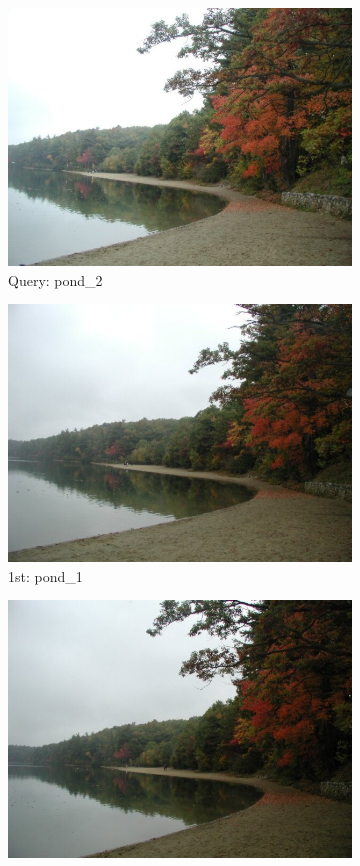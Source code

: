 \begin{itemize}
\begin{figure}[H]
	\centering
	\begin{subfigure}{0.25\textwidth}
	  \centering
	  \includegraphics[width=0.9\linewidth]{../input/pond_2.jpg}
	  \caption{Query: pond\_2}
	\end{subfigure}%
	\begin{subfigure}{0.25\textwidth}
	  \centering
	  \includegraphics[width=0.9\linewidth]{../input/pond_1.jpg}
	  \caption{1st: pond\_1}
	\end{subfigure}%
	\begin{subfigure}{0.25\textwidth}
        \centering
        \includegraphics[width=0.9\linewidth]{../input/pond_3.jpg}

\end{subfigure}
\end{figure}
\end{itemize}
